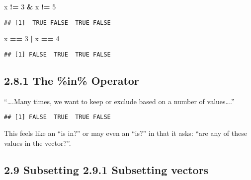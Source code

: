 \documentclass[]{article}
\newenvironment{Shaded}{\begin{snugshade}}{\end{snugshade}}
\newcommand{\DecValTok}[1]{\textcolor[rgb]{0.00,0.00,0.81}{#1}}
\newcommand{\KeywordTok}[1]{\textcolor[rgb]{0.13,0.29,0.53}{\textbf{#1}}}
\newcommand{\NormalTok}[1]{#1}
\newcommand{\OperatorTok}[1]{\textcolor[rgb]{0.81,0.36,0.00}{\textbf{#1}}}
\newcommand{\StringTok}[1]{\textcolor[rgb]{0.31,0.60,0.02}{#1}}
\begin{document}
\begin{Shaded}
\begin{Highlighting}[]
\NormalTok{x }\OperatorTok{!=}\StringTok{ }\DecValTok{3} \OperatorTok{&}\StringTok{ }\NormalTok{x }\OperatorTok{!=}\StringTok{ }\DecValTok{5}
\end{Highlighting}
\end{Shaded}

\begin{verbatim}
## [1]  TRUE FALSE  TRUE FALSE
\end{verbatim}

\begin{Shaded}
\begin{Highlighting}[]
\NormalTok{x }\OperatorTok{==}\StringTok{ }\DecValTok{3} \OperatorTok{|}\StringTok{ }\NormalTok{x }\OperatorTok{==}\StringTok{ }\DecValTok{4}
\end{Highlighting}
\end{Shaded}

\begin{verbatim}
## [1] FALSE  TRUE  TRUE FALSE
\end{verbatim}

\hypertarget{the-in-operator}{%
\subsection{2.8.1 The \%in\% Operator}\label{the-in-operator}}

``\ldots{}.Many times, we want to keep or exclude based on a number of
values\ldots{}.''

\begin{Shaded}
\end{Shaded}

\begin{verbatim}
## [1] FALSE  TRUE  TRUE FALSE
\end{verbatim}

This feels like an ``is in?'' or may even an ``is?'' in that it asks:
``are any of these values in the vector?''.

\hypertarget{subsetting-2.9.1-subsetting-vectors}{%
\subsection{2.9 Subsetting 2.9.1 Subsetting
vectors}\label{subsetting-2.9.1-subsetting-vectors}}
\end{document}

